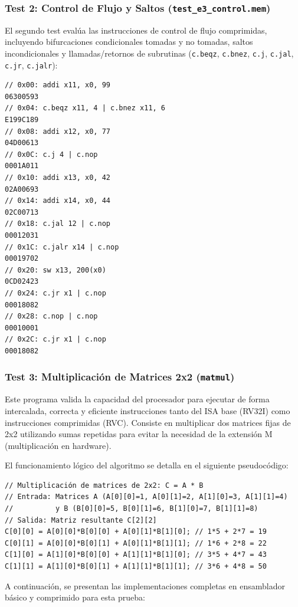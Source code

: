 \documentclass[12pt, a4paper]{article}
\begin{document}
\subsubsection{Test 2: Control de Flujo y Saltos (\texttt{test\_e3\_control.mem})}
El segundo test evalúa las instrucciones de control de flujo comprimidas, incluyendo bifurcaciones condicionales tomadas y no tomadas, saltos incondicionales y llamadas/retornos de subrutinas (\texttt{c.beqz}, \texttt{c.bnez}, \texttt{c.j}, \texttt{c.jal}, \texttt{c.jr}, \texttt{c.jalr}):

\begin{lstlisting}[style=verilogstyle, caption={Programa de Prueba de Control de Flujo: test\_e3\_control.mem}]
// 0x00: addi x11, x0, 99
06300593
// 0x04: c.beqz x11, 4 | c.bnez x11, 6
E199C189
// 0x08: addi x12, x0, 77
04D00613
// 0x0C: c.j 4 | c.nop
0001A011
// 0x10: addi x13, x0, 42
02A00693
// 0x14: addi x14, x0, 44
02C00713
// 0x18: c.jal 12 | c.nop
00012031
// 0x1C: c.jalr x14 | c.nop
00019702
// 0x20: sw x13, 200(x0)
0CD02423
// 0x24: c.jr x1 | c.nop
00018082
// 0x28: c.nop | c.nop
00010001
// 0x2C: c.jr x1 | c.nop
00018082
\end{lstlisting}
\subsubsection{Test 3: Multiplicación de Matrices 2x2 (\texttt{matmul})}
Este programa valida la capacidad del procesador para ejecutar de forma intercalada, correcta y eficiente instrucciones tanto del ISA base (RV32I) como instrucciones comprimidas (RVC). Consiste en multiplicar dos matrices fijas de 2x2 utilizando sumas repetidas para evitar la necesidad de la extensión M (multiplicación en hardware).

El funcionamiento lógico del algoritmo se detalla en el siguiente pseudocódigo:
\begin{lstlisting}[style=pseudo, caption={Algoritmo de Multiplicación de Matrices 2x2}]
// Multiplicación de matrices de 2x2: C = A * B
// Entrada: Matrices A (A[0][0]=1, A[0][1]=2, A[1][0]=3, A[1][1]=4) 
//          y B (B[0][0]=5, B[0][1]=6, B[1][0]=7, B[1][1]=8)
// Salida: Matriz resultante C[2][2]
C[0][0] = A[0][0]*B[0][0] + A[0][1]*B[1][0]; // 1*5 + 2*7 = 19
C[0][1] = A[0][0]*B[0][1] + A[0][1]*B[1][1]; // 1*6 + 2*8 = 22
C[1][0] = A[1][0]*B[0][0] + A[1][1]*B[1][0]; // 3*5 + 4*7 = 43
C[1][1] = A[1][0]*B[0][1] + A[1][1]*B[1][1]; // 3*6 + 4*8 = 50
\end{lstlisting}

A continuación, se presentan las implementaciones completas en ensamblador básico y comprimido para esta prueba:
\end{document}
